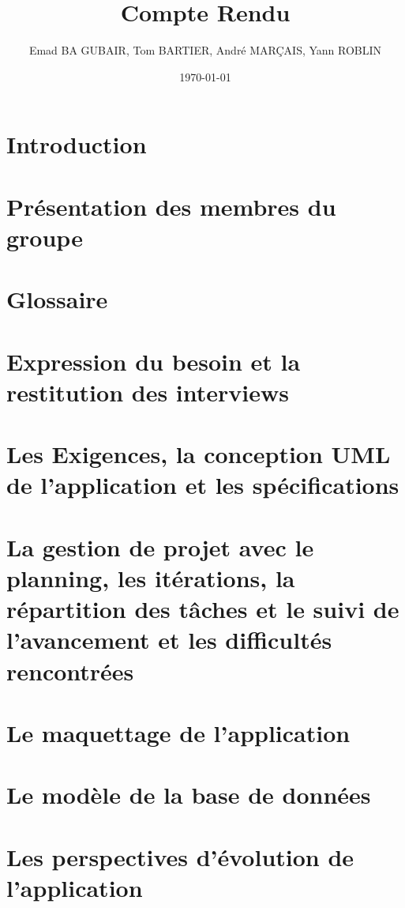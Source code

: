 \documentclass[a4paper,12pt]{article}
\title{Compte Rendu}
\author{Emad BA GUBAIR, Tom BARTIER, André MARÇAIS, Yann ROBLIN}
\date{\today}
\begin{document}
\maketitle

\tableofcontents
\newpage
\section{Introduction}
\section{Présentation des membres du groupe}
\section{Glossaire}
\section{Expression du besoin et la restitution des interviews}
\section{Les Exigences, la conception UML de l’application et les spécifications}
\section{La gestion de projet avec le planning, les itérations, la répartition des tâches et le suivi de l’avancement et les difficultés rencontrées}
\section{Le maquettage de l’application}
\section{Le modèle de la base de données}
\section{Les perspectives d’évolution de l’application}
\end{document}
